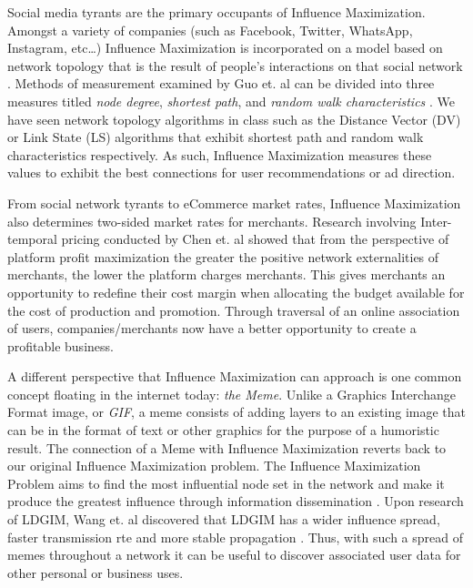 \documentclass[12pt]{article}
\begin{document}
Social media tyrants are the primary occupants of Influence Maximization. 
Amongst a variety of companies (such as Facebook, Twitter, WhatsApp, Instagram, etc\ldots) Influence Maximization is incorporated on a model based on network topology that is the result of people's interactions on that social network \cite{9045797}. 
Methods of measurement examined by Guo et. al can be divided into three measures titled \emph{node degree}, \emph{shortest path}, and \emph{random walk characteristics} \cite{9045797}. 
We have seen network topology algorithms in class such as the Distance Vector (DV) or Link State (LS) algorithms that exhibit shortest path and random walk characteristics respectively. 
As such, Influence Maximization measures these values to exhibit the best connections for user recommendations or ad direction.

From social network tyrants to eCommerce market rates, Influence Maximization also determines two-sided market rates for merchants. 
Research involving Inter-temporal pricing conducted by Chen et. al \cite{9188557} showed that from the perspective of platform profit maximization the greater the positive network externalities of merchants, the lower the platform charges merchants. 
This gives merchants an opportunity to redefine their cost margin when allocating the budget available for the cost of production and promotion. 
Through traversal of an online association of users, companies/merchants now have a better opportunity to create a profitable business.

A different perspective that Influence Maximization can approach is one common concept floating in the internet today: \emph{the Meme}. 
Unlike a Graphics Interchange Format image, or \emph{GIF}, a meme consists of adding layers to an existing image that can be in the format of text or other graphics for the purpose of a humoristic result. 
The connection of a Meme with Influence Maximization reverts back to our original Influence Maximization problem. 
The Influence Maximization Problem aims to find the most influential node set in the network and make it produce the greatest influence through information dissemination \cite{9695654}. 
Upon research of LDGIM, Wang et. al discovered that LDGIM has a wider influence spread, faster transmission rte and more stable propagation \cite{9695654}. 
Thus, with such a spread of memes throughout a network it can be useful to discover associated user data for other personal or business uses.
\end{document}
